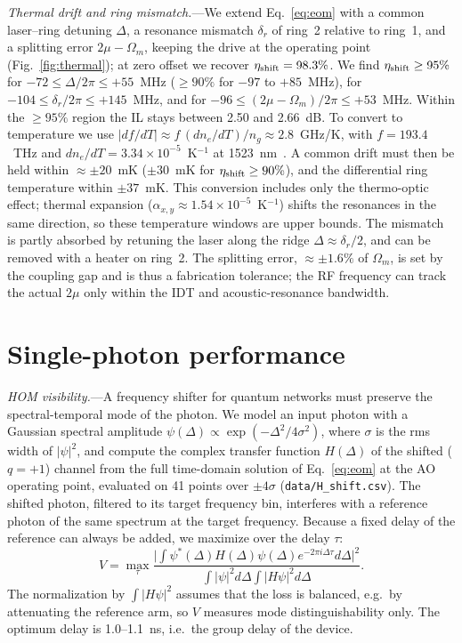 \documentclass[aps,prapplied,reprint,superscriptaddress,amsmath,amssymb,floatfix]{revtex4-2}
\newcommand{\etash}{\eta_{\rm shift}}
\begin{document}
\emph{Thermal drift and ring mismatch.}---We extend Eq.~\eqref{eq:eom} with a common laser--ring detuning $\Delta$, a resonance mismatch $\delta_r$ of ring~2 relative to ring~1, and a splitting error $2\mu-\Omega_m$, keeping the drive at the operating point (Fig.~\ref{fig:thermal}); at zero offset we recover $\etash=98.3\%$. We find $\etash\ge95\%$ for $-72\le\Delta/2\pi\le+55$~MHz ($\ge90\%$ for $-97$ to $+85$~MHz), for $-104\le\delta_r/2\pi\le+145$~MHz, and for $-96\le(2\mu-\Omega_m)/2\pi\le+53$~MHz. Within the $\ge95\%$ region the IL stays between 2.50 and 2.66~dB. To convert to temperature we use $|df/dT|\approx f\,(dn_e/dT)/n_g\approx2.8$~GHz/K, with $f=193.4$~THz and $dn_e/dT=3.34\times10^{-5}$~K$^{-1}$ at 1523~nm~\cite{Moretti2005}. A common drift must then be held within $\approx\pm20$~mK ($\pm30$~mK for $\etash\ge90\%$), and the differential ring temperature within $\pm37$~mK. This conversion includes only the thermo-optic effect; thermal expansion ($\alpha_{x,y}\approx1.54\times10^{-5}$~K$^{-1}$) shifts the resonances in the same direction, so these temperature windows are upper bounds. The mismatch is partly absorbed by retuning the laser along the ridge $\Delta\approx\delta_r/2$, and can be removed with a heater on ring~2. The splitting error, $\approx\pm1.6\%$ of $\Omega_m$, is set by the coupling gap and is thus a fabrication tolerance; the RF frequency can track the actual $2\mu$ only within the IDT and acoustic-resonance bandwidth.

\section{Single-photon performance}\label{sec:quantum}
\emph{HOM visibility.}---A frequency shifter for quantum networks must preserve the spectral-temporal mode of the photon. We model an input photon with a Gaussian spectral amplitude $\psi(\Delta)\propto\exp(-\Delta^2/4\sigma^2)$, where $\sigma$ is the rms width of $|\psi|^2$, and compute the complex transfer function $H(\Delta)$ of the shifted ($q=+1$) channel from the full time-domain solution of Eq.~\eqref{eq:eom} at the AO operating point, evaluated on 41 points over $\pm4\sigma$ (\texttt{data/H\_shift.csv}). The shifted photon, filtered to its target frequency bin, interferes with a reference photon of the same spectrum at the target frequency. Because a fixed delay of the reference can always be added, we maximize over the delay $\tau$:
\begin{equation}
V=\max_\tau\frac{\big|\int\psi^*(\Delta)H(\Delta)\psi(\Delta)e^{-2\pi i\Delta\tau}d\Delta\big|^2}{\int|\psi|^2d\Delta\int|H\psi|^2d\Delta}.
\label{eq:hom}
\end{equation}
The normalization by $\int|H\psi|^2$ assumes that the loss is balanced, e.g.\ by attenuating the reference arm, so $V$ measures mode distinguishability only. The optimum delay is 1.0--1.1~ns, i.e.\ the group delay of the device.
\end{document}
